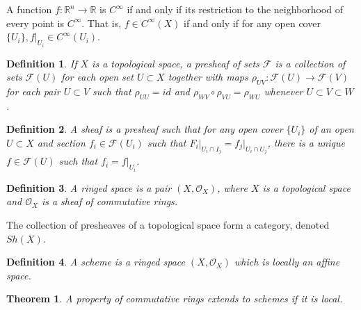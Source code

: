 \documentclass{article}
\theoremstyle{mystyle}
\newtheorem{theorem}{Theorem}[section]
\newtheorem{definition}{Definition}[section]
\begin{document}
A function $f:\mathbb{R}^n \rightarrow \mathbb{R}$ is $C^{\infty}$ if and only if its restriction to the neighborhood of every point is $C^{\infty}$. That is, $f\in C^{\infty}(X)$ if and only if for any open cover $\{U_i\},f\big|_{U_i}\in C^{\infty}(U_i)$.
\begin{definition}
If $X$ is a topological space, a presheaf of sets $\mathcal{F}$ is a collection of sets $\mathcal{F}(U)$ for each open set $U\subset X$ together with maps $\rho_{UV}:\mathcal{F}(U)\rightarrow \mathcal{F}(V)$ for each pair $U\subset V$ such that $\rho_{UU} = id$ and $\rho_{WV}\circ \rho_{VU} = \rho_{WU}$ whenever $U\subset V \subset W$.
\end{definition}
\begin{definition}
A sheaf is a presheaf such that for any open cover $\{U_i\}$ of an open $U\subset X$ and section $f_i \in \mathcal{F}(U_i)$ such that $F_i\big|_{U_i\cap I_j} = f_j\big|_{U_i\cap U_j}$, there is a unique $f\in \mathcal{F}(U)$ such that $f_i = f\big|_{U_i}$.
\end{definition}
\begin{definition}
A ringed space is a pair $(X,\mathcal{O}_X)$, where $X$ is a topological space and $\mathcal{O}_X$ is a sheaf of commutative rings.
\end{definition}
The collection of presheaves of a topological space form a category, denoted $Sh(X)$. 
\begin{definition}
A scheme is a ringed space $(X,\mathcal{O}_X)$ which is locally an affine space.
\end{definition}
\begin{theorem}
A property of commutative rings extends to schemes if it is local.
\end{theorem}
\end{document}
